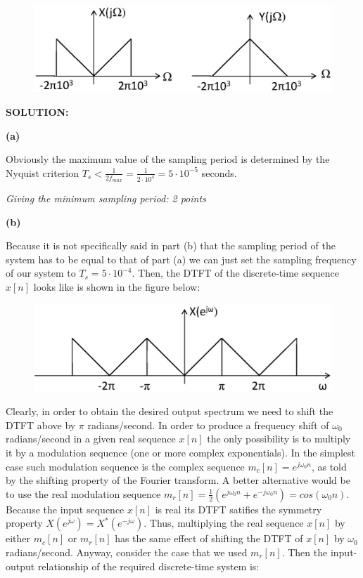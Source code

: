 \documentclass[a4paper,11pt,oneside]{article}
\begin{document}
\begin{figure}[h!]
\centering
\includegraphics[width=.8\textwidth]{fig4.eps}
\end{figure}

\vspace{1cm}

\textbf{SOLUTION:}

\textbf{(a)}

Obviously the maximum value of the sampling period is determined by the Nyquist criterion $T_s<\frac{1}{2f_{max}}=\frac{1}{2\cdot 10^4}=5\cdot 10^{-5}$ seconds.

\emph{Giving the minimum sampling period: 2 points}


\textbf{(b)}

Because it is not specifically said in part (b) that the sampling period of the system has to be equal to that of part (a) we can just set the sampling frequency of our system to $T_s=5\cdot 10^{-4}$. Then, the DTFT of the discrete-time sequence $x[n]$ looks like is shown in the figure below:

\begin{figure}[h!]
\centering
\includegraphics[width=.8\textwidth]{ex3sol1fig1.eps}
\end{figure}

Clearly, in order to obtain the desired output spectrum we need to shift the DTFT above by $\pi$ radians/second. In order to produce a frequency shift of $\omega_0$ radians/second in a given real sequence $x[n]$ the only possibility is to multiply it by a modulation sequence (one or more complex exponentials). In the simplest case such modulation sequence is the complex sequence $m_c[n]=e^{j\omega_0 n}$, as told by the shifting property of the Fourier transform. A better alternative would be to use the real modulation sequence $m_r[n]=\frac{1}{2}\left(e^{j\omega_0 n}+e^{-j\omega_0 n}\right)=cos(\omega_0 n)$. Because the input sequence $x[n]$ is real its DTFT satifies the symmetry property $X(e^{j\omega})=X^*(e^{-j\omega})$. Thus, multiplying the real sequence $x[n]$ by either $m_c[n]$ or $m_{r}[n]$ has the same effect of shifting the DTFT of $x[n]$ by $\omega_0$ radians/second. Anyway, consider the case that we used $m_{r}[n]$. Then the input-output relationship of the required discrete-time system is:
\end{document}
